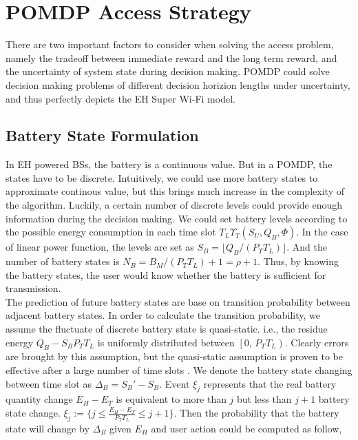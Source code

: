 \documentclass[conference]{IEEEtran}
\begin{document}
\section{POMDP Access Strategy}
There are two important factors to consider when solving the access problem, 
namely the tradeoff between immediate reward and the long term reward, and
the uncertainty of system state during decision making.
POMDP could solve decision making problems
of different decision horizion lengths under uncertainty,
and thus perfectly depicts the EH Super Wi-Fi model.
\subsection{Battery State Formulation}
In EH powered BSs, the battery is a continuous value.
But in a POMDP, the states have to be discrete.
Intuitively, we could use more battery states to approximate continous value,
but this brings much increase in the complexity of the algorithm.
Luckily, a certain number of discrete levels could provide enough information during the decision making.
We could set battery levels according to the possible energy consumption in each time slot \(T_L\Upsilon_T(S_U,Q_B,\Phi)\).
In the case of linear power function, the levels are set as \(S_B = \lfloor Q_B / \left(P_TT_L\right) \rfloor\).
And the number of battery states is \(N_B = B_M / \left(P_TT_L\right) +1 = \rho + 1\).
Thus, by knowing the battery states, 
the user would know whether the battery is sufficient for transmission.\\
\indent
The prediction of future battery states are base on transition probability between adjacent battery states.
In order to calculate the transition probability,
we assume the fluctuate of discrete battery state is quasi-static.
i.e., the residue energy \(Q_B - S_BP_TT_L\) is uniformly distributed between \(\left[0,\,P_TT_L\right)\).
Clearly errors are brought by this assumption,
but the quasi-static assumption is proven to be effective after a large number of time slots \cite{data}.
We denote the battery state changing between time slot as \(\Delta_B = S_{B}' - S_B\).
Event \(\xi_j\) represents that the real battery quantity change \(E_H - E_T\)
is equivalent to more than \(j\) but less than \(j+1\) battery state change.
\(\xi_j := \{j\leq \frac{E_H - E_T}{P_TT_L} \le j+1\}\).
Then the probability that the battery state will change by \(\Delta_B\) 
given \(E_H\) and user action could be computed as follow,
\end{document}
